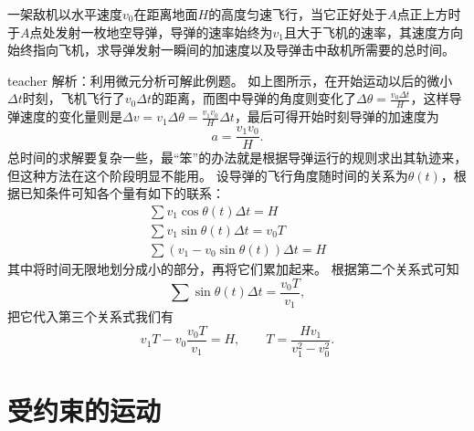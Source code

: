 \begin{example}
一架敌机以水平速度$v_0$在距离地面$H$的高度匀速飞行，当它正好处于$A$点正上方时于$A$点处发射一枚地空导弹，导弹的速率始终为$v_1$且大于飞机的速率，其速度方向始终指向飞机，求导弹发射一瞬间的加速度以及导弹击中敌机所需要的总时间。

\begin{taggedblock}{teacher}
\noindent
解析：利用微元分析可解此例题。
如上图所示，在开始运动以后的微小$\Delta t$时刻，飞机飞行了$v_0\Delta t$的距离，而图中导弹的角度则变化了$\Delta\theta = \frac{v_0\Delta t}{H}$，这样导弹速度的变化量则是$\Delta v = v_1\Delta \theta = \frac{v_1v_0}{H}\Delta t$，最后可得开始时刻导弹的加速度为
\[
a = \frac{v_1v_0}{H}.
\]
总时间的求解要复杂一些，最“笨”的办法就是根据导弹运行的规则求出其轨迹来，但这种方法在这个阶段明显不能用。
设导弹的飞行角度随时间的关系为$\theta(t)$，根据已知条件可知各个量有如下的联系：
\begin{eqnarray*}
\sum v_1\cos\theta(t)\Delta t = H\\
\sum v_1\sin\theta(t)\Delta t = v_0T\\
\sum (v_1-v_0\sin\theta(t))\Delta t = H
\end{eqnarray*}
其中将时间无限地划分成小的部分，再将它们累加起来。
根据第二个关系式可知
\[
\sum \sin\theta(t)\Delta t = \frac{v_0T}{v_1},
\]
把它代入第三个关系式我们有
\[
v_1T-v_0\frac{v_0T}{v_1} = H,\qquad T = \frac{Hv_1}{v_1^2-v_0^2}.
\]
\end{taggedblock}
\end{example}







\section{受约束的运动}

